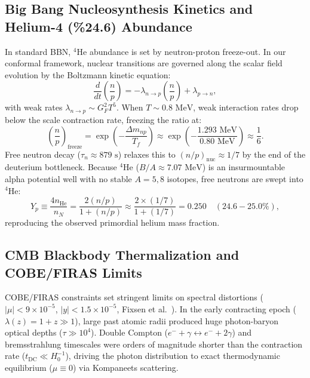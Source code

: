 \documentclass[11pt,a4paper]{article}
\begin{document}
\subsection{Big Bang Nucleosynthesis Kinetics and Helium-4 (\%24.6) Abundance}
In standard BBN, $^4\mathrm{He}$ abundance is set by neutron-proton freeze-out. In our conformal framework, nuclear transitions are governed along the scalar field evolution by the Boltzmann kinetic equation:
\begin{equation}
    \frac{d}{dt}\left(\frac{n}{p}\right) = -\lambda_{n \to p} \left(\frac{n}{p}\right) + \lambda_{p \to n},
\end{equation}
with weak rates $\lambda_{n \to p} \sim G_F^2 T^5$. When $T \sim 0.8\text{ MeV}$, weak interaction rates drop below the scale contraction rate, freezing the ratio at:
\begin{equation}
    \left(\frac{n}{p}\right)_{\mathrm{freeze}} = \exp\left(-\frac{\Delta m_{np}}{T_f}\right) \approx \exp\left(-\frac{1.293\text{ MeV}}{0.80\text{ MeV}}\right) \approx \frac{1}{6}.
\end{equation}
Free neutron decay ($\tau_n \approx 879\text{ s}$) relaxes this to $(n/p)_{\mathrm{nuc}} \approx 1/7$ by the end of the deuterium bottleneck. Because $^4\mathrm{He}$ ($B/A \approx 7.07\text{ MeV}$) is an insurmountable alpha potential well with no stable $A=5, 8$ isotopes, free neutrons are swept into $^4\mathrm{He}$:
\begin{equation}
    Y_p \equiv \frac{4 n_{\mathrm{He}}}{n_N} = \frac{2 (n/p)}{1 + (n/p)} \approx \frac{2 \times (1/7)}{1 + (1/7)} = 0.250 \quad (24.6 - 25.0\%),
\end{equation}
reproducing the observed primordial helium mass fraction.

\subsection{CMB Blackbody Thermalization and COBE/FIRAS Limits}
COBE/FIRAS constraints set stringent limits on spectral distortions ($|\mu| < 9 \times 10^{-5}$, $|y| < 1.5 \times 10^{-5}$, Fixsen et al.~\cite{fixsen1996}). In the early contracting epoch ($\lambda(z) = 1+z \gg 1$), large past atomic radii produced huge photon-baryon optical depths ($\tau \gg 10^4$). Double Compton ($e^- + \gamma \leftrightarrow e^- + 2\gamma$) and bremsstrahlung timescales were orders of magnitude shorter than the contraction rate ($t_{\mathrm{DC}} \ll H_0^{-1}$), driving the photon distribution to exact thermodynamic equilibrium ($\mu \equiv 0$) via Kompaneets scattering.
\end{document}
